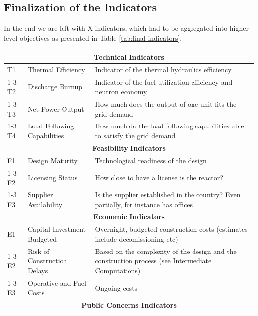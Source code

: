 \subsection{Finalization of the Indicators}
In the end we are left with X indicators, which had to be aggregated into higher level objectives as presented in Table \ref{tab:final-indicators}.

\begin{table}[!hb]
    \centering
    \begin{tabularx}{\textwidth}{llX}
        \toprule
        \multicolumn{3}{c}{\textbf{Technical Indicators}} \\
        \midrule
        T1 & Thermal Efficiency & Indicator of the thermal hydraulics efficiency \\
        \cmidrule(lr){1-3}
        T2 & Discharge Burnup & Indicator of the fuel utilization efficiency and neutron economy \\
        \cmidrule(lr){1-3}
        T3 & Net Power Output & How much does the output of one unit fits the grid demand \\
        \cmidrule(lr){1-3}
        T4 & Load Following Capabilities & How much do the load following capabilities able to satisfy the grid demand \\
        \midrule
        \multicolumn{3}{c}{\textbf{Feasibility Indicators}} \\
        \midrule
        F1 & Design Maturity & Technological readiness of the design \\
        \cmidrule(lr){1-3}
        F2 & Licensing Status & How close to have a license is the reactor? \\
        \cmidrule(lr){1-3}
        F3 & Supplier Availability & Is the supplier established in the country? Even partially, for instance has offices \\
        \midrule
        \multicolumn{3}{c}{\textbf{Economic Indicators}} \\
        \midrule
        E1 & Capital Investment Budgeted & Overnight, budgeted construction costs (estimates include decomissioning etc) \\
        \cmidrule(lr){1-3}
        E2 & Risk of Construction Delays & Based on the complexity of the design and the construction process (see Intermediate Computations) \\
        \cmidrule(lr){1-3}
        E3 & Operative and Fuel Costs & Ongoing costs \\
        \midrule
        \multicolumn{3}{c}{\textbf{Public Concerns Indicators}} \\

\end{tabularx}
\end{table}

